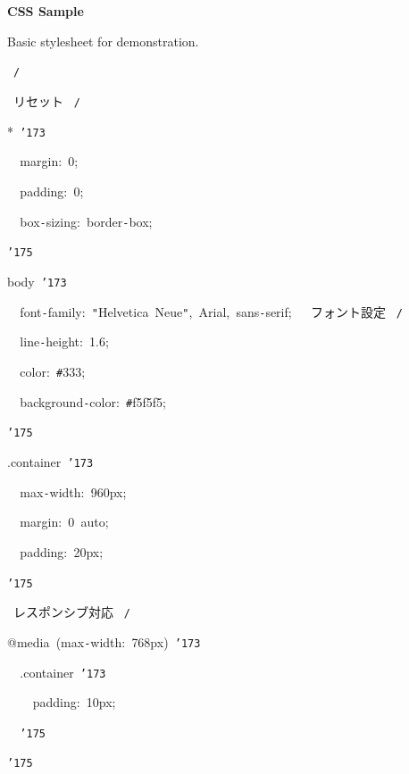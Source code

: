 \documentclass[a4paper,10pt]{article}
\def\mc{\relax}
\begin{document}
\tt\mc 

\noindent
\mbox{}\rm\mc {\tt /}{\tt *}\ 
\tt\mc 

\noindent
\mbox{}\rm\mc {\tt\mc \ }{\tt *} \parbox[t]{0.85\textwidth}{\ \centerline{\bf CSS Sample} }
\tt\mc 

\noindent
\mbox{}\rm\mc {\tt\mc \ }{\tt *} Basic stylesheet for demonstration.
\tt\mc 

\noindent
\mbox{}\rm\mc {\tt\mc \ }\rm\mc \ {\tt *}{\tt /}
\tt\mc 

\noindent
\mbox{}\hfill

\noindent
\mbox{}\rm\mc {\tt /}{\tt *}\  リセット \rm\mc \ {\tt *}{\tt /}
\tt\mc 

\noindent
\mbox{}*{\tt\mc \ }{\tt\char'173}

\noindent
\mbox{}{\tt\mc \ }{\tt\mc \ }margin:{\tt\mc \ }0;

\noindent
\mbox{}{\tt\mc \ }{\tt\mc \ }padding:{\tt\mc \ }0;

\noindent
\mbox{}{\tt\mc \ }{\tt\mc \ }box{\tt -}sizing:{\tt\mc \ }border{\tt -}box;

\noindent
\mbox{}{\tt\char'175}

\noindent
\mbox{}\hfill

\noindent
\mbox{}body{\tt\mc \ }{\tt\char'173}

\noindent
\mbox{}{\tt\mc \ }{\tt\mc \ }font{\tt -}family:{\tt\mc \ }{\tt "}Helvetica{\tt\mc \ }Neue{\tt "},{\tt\mc \ }Arial,{\tt\mc \ }sans{\tt -}serif;{\tt\mc \ }{\tt\mc \ }\rm\mc {\tt /}{\tt *}\  フォント設定 \rm\mc \ {\tt *}{\tt /}
\tt\mc 

\noindent
\mbox{}{\tt\mc \ }{\tt\mc \ }line{\tt -}height:{\tt\mc \ }1.6;

\noindent
\mbox{}{\tt\mc \ }{\tt\mc \ }color:{\tt\mc \ }{\tt\#}333;

\noindent
\mbox{}{\tt\mc \ }{\tt\mc \ }background{\tt -}color:{\tt\mc \ }{\tt\#}f5f5f5;

\noindent
\mbox{}{\tt\char'175}

\noindent
\mbox{}\hfill

\noindent
\mbox{}.container{\tt\mc \ }{\tt\char'173}

\noindent
\mbox{}{\tt\mc \ }{\tt\mc \ }max{\tt -}width:{\tt\mc \ }960px;

\noindent
\mbox{}{\tt\mc \ }{\tt\mc \ }margin:{\tt\mc \ }0{\tt\mc \ }auto;

\noindent
\mbox{}{\tt\mc \ }{\tt\mc \ }padding:{\tt\mc \ }20px;

\noindent
\mbox{}{\tt\char'175}

\noindent
\mbox{}\hfill

\noindent
\mbox{}\rm\mc {\tt /}{\tt *}\  レスポンシブ対応 \rm\mc \ {\tt *}{\tt /}
\tt\mc 

\noindent
\mbox{}@media{\tt\mc \ }(max{\tt -}width:{\tt\mc \ }768px){\tt\mc \ }{\tt\char'173}

\noindent
\mbox{}{\tt\mc \ }{\tt\mc \ }.container{\tt\mc \ }{\tt\char'173}

\noindent
\mbox{}{\tt\mc \ }{\tt\mc \ }{\tt\mc \ }{\tt\mc \ }padding:{\tt\mc \ }10px;

\noindent
\mbox{}{\tt\mc \ }{\tt\mc \ }{\tt\char'175}

\noindent
\mbox{}{\tt\char'175}

\rm\mc
\end{document}
